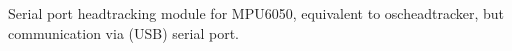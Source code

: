 Serial port headtracking module for MPU6050, equivalent to oscheadtracker, but communication via (USB) serial port.


